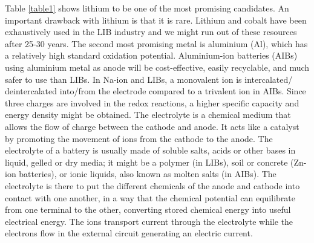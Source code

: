 Table \ref{table1} shows lithium to be one of the most promising candidates. An important drawback with lithium is that it is rare. Lithium and cobalt have been exhaustively used in the LIB industry and we might run out of these resources after 25-30 years. The second most promising metal is aluminium (Al), which has a relatively high standard oxidation potential. Aluminium-ion batteries (AIBs) using aluminium metal as anode will be cost-effective, easily recyclable, and much safer to use than LIBs.  In Na-ion and LIBs, a monovalent ion is intercalated/ deintercalated into/from the electrode compared to a trivalent ion in AIBs. Since three charges are involved in the redox reactions, a higher specific capacity and energy density might be obtained. The electrolyte is a chemical medium that allows the flow of charge between the cathode and anode. It acts like a catalyst by promoting the movement of ions from the cathode to the anode. The electrolyte of a battery is usually made of soluble salts, acids or other bases in liquid, gelled or dry media; it might be a polymer (in LIBs), soil or concrete (Zn-ion batteries), or ionic liquids, also known as molten salts (in AIBs). The electrolyte is there to put the different chemicals of the anode and cathode into contact with one another, in a way that the chemical potential can equilibrate from one terminal to the other, converting stored chemical energy into useful electrical energy. The ions transport current through the electrolyte while the electrons flow in the external circuit generating an electric current. 

